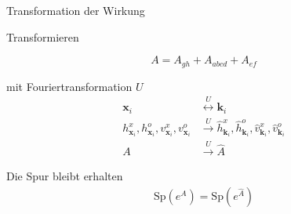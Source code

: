 \documentclass[11pt]{beamer}
\newcommand{\Sp}[1]{\mathrm{Sp}\left( #1 \right)}
\begin{document}
        \begin{frame}{Transformation der Wirkung}
    
    Transformieren
    
    \begin{equation} \nonumber
     A = A_{gh} + A_{abcd} + A_{ef} 
    \end{equation}
    
    mit Fouriertransformation  $U$
        \begin{align} \nonumber
            \bm{x}_i &\overset{U}{\longleftrightarrow} \bm{k}_i \\ \nonumber
            h_{\bm{x}_i}^x, h_{\bm{x}_i}^o, v_{\bm{x}_i}^x, v_{\bm{x}_i}^o &\overset{U}{\longrightarrow} \hat h_{\bm{k}_i}^x, \hat h_{\bm{k}_i}^o, \hat v_{\bm{k}_i}^x, \hat v_{\bm{k}_i}^o \\ \nonumber
           A &\overset{U}{\longrightarrow} \hat A
        \end{align}
    
    Die Spur bleibt erhalten
        \begin{align} \nonumber
            \Sp{e^A} = \Sp{e^{\hat{A}}}
        \end{align}

    \end{frame}
    
    
    
    
    
    
    
\end{document}
